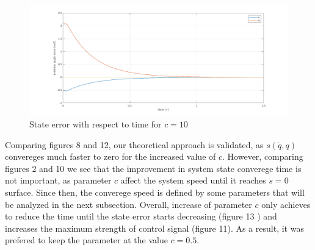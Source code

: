 \documentclass[a4paper]{article}
\begin{document}
\begin{figure}[H]
    \centering
    \includegraphics[width=15cm]{fig/sim1/ec10.png}
    \caption{State error with respect to time for $c=10$}
\end{figure}

\noindent\hspace{-2pt}
Comparing figures 8 and 12, our theoretical approach is validated, as $s(\dot{q}, q)$ convereges much faster to zero 
for the increased value of $c$. However, comparing figures 2 and 10 we see that the improvement in system state converege time 
is not important, as parameter $c$ affect the system speed until it reaches $s=0$ surface. Since then, the converege speed is 
defined by some parameters that will be analyzed in the next subsection. Overall, increase of parameter $c$ only achieves to 
reduce the time until the state error starts decreasing (figure 13 ) and increases the maximum strength of control signal (figure 11). 
As a result, it was prefered to keep the parameter at the value $c=0.5$.
\end{document}
